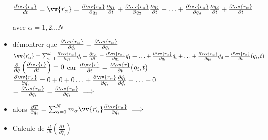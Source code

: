 \documentclass[12pt,oneside]{book}
\begin{document}
\begin{small}
\begin{itemize}
	      $\frac{d\vv{r_\alpha}}{dt} =\vv{\dot{r_\alpha}}= \frac{\partial\vv{r_\alpha}}{\partial q_1}\frac{\partial q_1}{\partial t}+\frac{\partial\vv{r_\alpha}}{\partial q_2}\frac{\partial q_2}{\partial t} + \ldots +\frac{\partial\vv{r_\alpha}}{\partial q_d}\frac{\partial q_d}{\partial t}+\frac{\partial\vv{r_\alpha}}{\partial t}$ \\
	      \begin{center}
		       avec $\alpha = 1,2\ldots N$
	      \end{center}
	\item démontrer que $\frac{\partial\vv{\dot{r_\alpha}}}{\partial\dot{q_i}} = \frac{\partial\vv{r_\alpha}}{\partial q_i}$ \\
	      $\vv{\dot{r_\alpha}} =\sum^d_{i =1} \frac{\partial\vv{r_\alpha}}{\partial q_i}\dot{q_i} + \frac{\partial r_\alpha}{\partial t} = \frac{\partial \vv{r_\alpha}}{\partial q_1}\dot{q_1} + \ldots+ \frac{\partial \vv{r_\alpha}}{\partial q_i}\dot{q_i} + \ldots + \frac{\partial \vv{r_\alpha}}{\partial q_d}\dot{q_d} +\frac{\partial \vv{r_\alpha}}{\partial t}(q_i,t)$ \\
	      $\frac{\partial}{\partial \dot{q}}\left( \frac{\partial\vv{r}}{\partial t} \right) = 0$ car $\frac{\partial\vv{r}}{\partial t} = \frac{\partial \vv{r}}{\partial t}(q_i,t)$ \\
	      $\frac{\partial \vv{\dot{r_\alpha}}}{\partial\dot{q_i}} = 0 +0 +0 \ldots + \frac{\partial \vv{r_\alpha }}{\partial q_i}\frac{\partial \dot{q_i}}{\partial \dot{q_i}} + \ldots + 0$ \\
	      $=\frac{\partial\vv{r_\alpha}}{\partial q_i} = \frac{\partial\vv{r_\alpha}}{\partial q_i} \implies$ \\
	\item alors $\frac{\partial T}{\partial \dot{q_i}} =\sum^N_{\alpha =1}m_\alpha \vv{\dot{r_\alpha}}\frac{\partial \vv{\dot{r_\alpha}}}{\partial \dot{q_i}} \implies $ \\
	\item Calcule de $\frac{d}{dt}\left( \frac{\partial T}{\partial \dot{q_i}} \right)$ \\
	      \begin{itemize}

\end{itemize}
\end{itemize}
\end{small}
\end{document}
